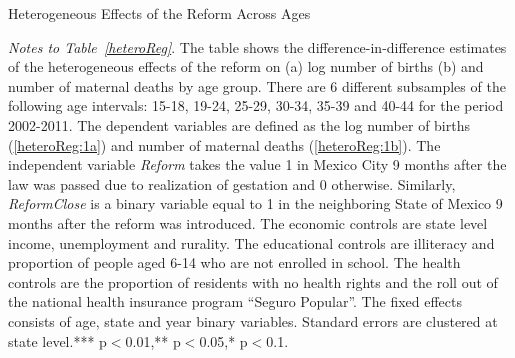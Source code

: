 \documentclass[a4paper, 11pt]{article}
\begin{document}
\begin{spacing}{1.4}
\begin{table}[H]  \caption{Heterogeneous Effects of the Reform Across Ages} \label{heteroReg}
  \begin{threeparttable}
    \begin{subtable}{1\textwidth} \label{heteroReg:1a}
      {\footnotesize  }
    \end{subtable}
    \begin{subtable}{1\textwidth}  \label{heteroReg:1b}
      {\footnotesize  }
    \end{subtable}
    \begin{tablenotes}
      \footnotesize
    \item \textit{Notes to Table~\ref{heteroReg}}. The table shows the difference-in-difference estimates of the heterogeneous effects of the reform on (a) log number of births (b) and number of maternal deaths by age group. There are 6 different subsamples of the following age intervals: 15-18, 19-24, 25-29, 30-34, 35-39 and 40-44 for the period 2002-2011. The dependent variables are defined as the log number of births (\ref{heteroReg:1a}) and number of maternal deaths (\ref{heteroReg:1b}). The independent variable \textit{Reform} takes the value 1 in Mexico City 9 months after the law was passed due to realization of gestation and 0 otherwise. Similarly, \textit{ReformClose} is a binary variable equal to 1 in the neighboring State of Mexico 9 months after the reform was introduced. The economic controls are state level income, unemployment and rurality. The educational controls are illiteracy and proportion of people aged 6-14 who are not enrolled in school. The health controls are the proportion of residents with no health rights and the roll out of the national health insurance program ``Seguro Popular''. The fixed effects consists of age, state and year binary variables. Standard errors are clustered at state level.*** p$<$0.01,** p$<$0.05,* p$<$0.1.
    \end{tablenotes}
  \end{threeparttable}
\end{table}
\restoregeometry


\end{spacing}
\end{document}
